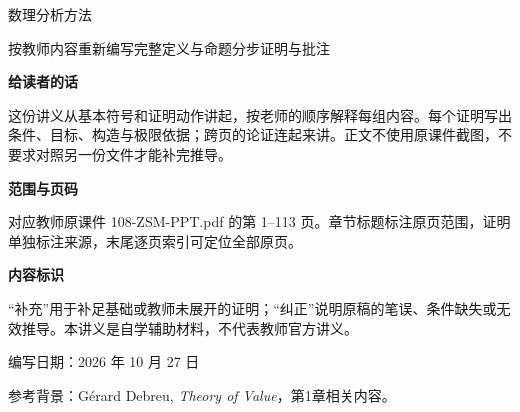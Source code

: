 
\newcommand{\LectureID}{108}

\begin{titlepage}
\vspace*{1.4cm}
{\Huge\sffamily 数理分析方法\par}
\vspace{.8cm}{\LARGE\sffamily 连续对应与最优化稳定性\par}
\vspace{.5cm}{\Large Lecture 108 · 证明考试自学讲义\par}
\vspace{1cm}
按教师内容重新编写\quad 完整定义与命题\quad 分步证明与批注\par
\vspace{.7cm}
\textbf{给读者的话}\par
这份讲义从基本符号和证明动作讲起，按老师的顺序解释每组内容。每个证明写出条件、目标、构造与极限依据；跨页的论证连起来讲。正文不使用原课件截图，不要求对照另一份文件才能补完推导。\par
\textbf{范围与页码}\par
对应教师原课件 108-ZSM-PPT.pdf 的第 1--113 页。章节标题标注原页范围，证明单独标注来源，末尾逐页索引可定位全部原页。\par
\textbf{内容标识}\par
“补充”用于补足基础或教师未展开的证明；“纠正”说明原稿的笔误、条件缺失或无效推导。本讲义是自学辅助材料，不代表教师官方讲义。\par
\vfill
编写日期：2026 年 10 月 27 日\par
参考背景：Gérard Debreu, \emph{Theory of Value}，第1章相关内容。
\end{titlepage}
\tableofcontents\clearpage



